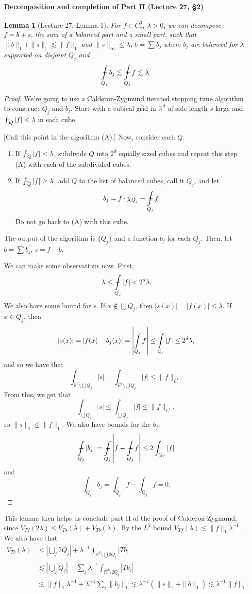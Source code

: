 \documentclass[UTF8,11pt]{ctexart}
\newtheorem*{lemma}{Lemma}
\theoremstyle{definition}
\newcommand{\R}{\mathbb R}
\providecommand{\fint}{\mathop{\rlap{\hspace{0.18em}$-$}\!\int}}
\begin{document}
\paragraph{Decomposition and completion of Part II (Lecture 27, \S2)}
\begin{lemma}[Lecture 27, Lemma 1]
For $f\in C_c^0$, $\lambda>0$, we can decompose $f=b+s$, the sum of a balanced part and a small part, such that $\|b\|_1+\|s\|_1\lesssim\|f\|_1$ and $\|s\|_\infty\leq\lambda$, $b=\sum b_j$ where $b_j$ are balanced for $\lambda$ supported on disjoint $Q_j$ and
\[\fint_{Q_j}b_j\lesssim\fint_{Q_j}f\lesssim\lambda.\]
\end{lemma}
\begin{proof}
We're going to use a Calderon-Zygmund iterated stopping time algorithm to construct $Q_j$ and $b_j$. Start with a cubical grid in $\R^d$ of side length $s$ large and $\fint_Q|f|<\lambda$ in each cube.

[Call this point in the algorithm (A).] Now, consider each $Q$.
\begin{enumerate}[label=(\roman*)]
\item If $\fint_Q|f|<\lambda$, subdivide $Q$ into $2^d$ equally sized cubes and repeat this step (A) with each of the subdivided cubes.
\item If $\fint_Q|f|\geq\lambda$, add $Q$ to the list of balanced cubes, call it $Q_j$, and let
\[b_j=f\cdot\chi_{Q_j}-\fint_{Q_j}f.\]
Do not go back to (A) with this cube.
\end{enumerate}
The output of the algorithm is $\{Q_j\}$ and a function $b_j$ for each $Q_j$. Then, let $b=\sum b_j$, $s=f-b$.

We can make some observations now. First,
\[\lambda\leq\fint_{Q_j}|f|<2^d\lambda.\]
We also have some bound for $s$. If $x\notin\bigcup Q_j$, then $|s(x)|=|f(x)|\leq\lambda$. If $x\in Q_j$, then
\[|s(x)|=|f(x)-b_j(x)|=\left|\fint_{Q_j}f\right|\leq\fint_{Q_j}|f|\leq2^d\lambda,\]
and so we have that
\[\int_{\R^d\setminus\bigcup Q_j}|s|=\int_{\R^d\setminus\bigcup Q_j}|f|\leq\|f\|_{L^1}.\]
From this, we get that
\[\int_{\bigcup Q_j}|s|\leq\int_{\bigcup Q_j}|f|\leq\|f\|_{L^1},\]
so $\|s\|_1\leq\|f\|_1$. We also have bounds for the $b_j$:
\[\fint_{Q_j}|b_j|=\fint_{Q_j}\left|f-\fint_{Q_j}f\right|\leq2\int_{Q_j}|f|\]
and
\[\int_{Q_j}b_j=\int_{Q_j}f-\int_{Q_j}f=0.\]
\end{proof}
This lemma then helps us conclude part II of the proof of Calderon-Zygmund, since $V_{Tf}(2\lambda)\leq V_{Ts}(\lambda)+V_{Tb}(\lambda)$. By the $L^2$ bound $V_{Tf}(\lambda)\lesssim\|f\|_1\lambda^{-1}$. We also have that
\begin{align*}
V_{Tb}(\lambda)&\leq\left|\bigcup_j2Q_j\right|+\lambda^{-1}\int_{\R^d\setminus\bigcup2Q_j}|Tb|\\
&\lesssim\left|\bigcup_jQ_j\right|+\sum_j\lambda^{-1}\int_{\R^d\setminus2Q_j}|Tb_j|\\
&\lesssim\|f\|_1\lambda^{-1}+\lambda^{-1}\sum_j\|b_j\|_1
\lesssim\lambda^{-1}(\|s\|_1+\|b\|_1)\lesssim\lambda^{-1}\|f\|_1.
\end{align*}
\end{document}
